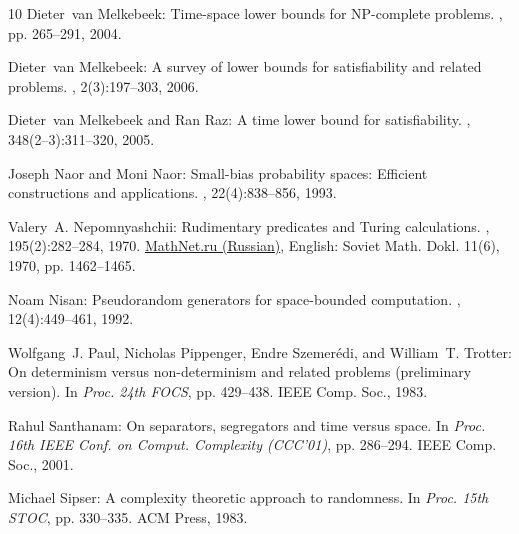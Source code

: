 \begin{thebibliography}{10}
{\sc Dieter~van Melkebeek}: Time-space lower bounds for {NP}-complete problems.
, pp. 265--291, 2004.
\newblock [\epfmtdoi{10.1142/9789812562494\_0015}]

{\sc Dieter~van Melkebeek}: A survey of lower bounds for satisfiability and
  related problems.
, 2(3):197--303, 2006.
\newblock [\epfmtdoi{10.1561/0400000012}]

{\sc Dieter~van Melkebeek and Ran Raz}: A time lower bound for satisfiability.
, 348(2--3):311--320, 2005.

{\sc Joseph Naor and Moni Naor}: Small-bias probability spaces: {E}fficient
  constructions and applications.
, 22(4):838--856, 1993.
\newblock [\epfmtdoi{10.1137/0222053}]

{\sc Valery~A. Nepomnyashchii}: Rudimentary predicates and {T}uring
  calculations.
, 195(2):282--284, 1970.
\newblock
  \href{http://www.mathnet.ru/php/archive.phtml?wshow=paper&jrnid=dan&paperid=35780&option\_lang=eng}{MathNet.ru
  (Russian)}, English: Soviet Math. Dokl. 11(6), 1970, pp. 1462--1465.

{\sc Noam Nisan}: Pseudorandom generators for space-bounded computation.
, 12(4):449--461, 1992.
\newblock [\epfmtdoi{10.1007/BF01305237}]

{\sc Wolfgang~J. Paul, Nicholas Pippenger, Endre Szemer{\'e}di, and William~T.
  Trotter}: On determinism versus non-determinism and related problems
  (preliminary version).
\newblock In {\em Proc. 24th FOCS}, pp. 429--438. IEEE Comp. Soc., 1983.

{\sc Rahul Santhanam}: On separators, segregators and time versus space.
\newblock In {\em Proc. 16th IEEE Conf. on Comput. Complexity (CCC'01)}, pp.
  286--294. IEEE Comp. Soc., 2001.

{\sc Michael Sipser}: A complexity theoretic approach to randomness.
\newblock In {\em Proc. 15th STOC}, pp. 330--335. ACM Press, 1983.
\newblock [\epfmtdoi{10.1145/800061.808762}]


\end{thebibliography}
